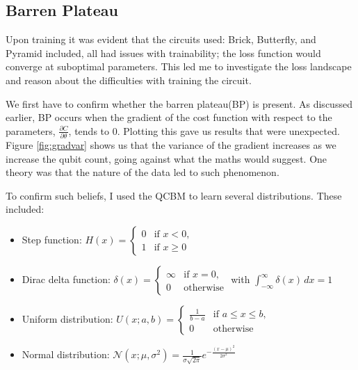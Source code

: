 \documentclass[12pt]{article}
\newcommand{\newp}
    {
    \vskip 0.5cm 
  }
\numberwithin{equation}{section}
\begin{document}
\subsection{Barren Plateau}
Upon training it was evident that the circuits used: Brick, Butterfly, and Pyramid 
included, all had issues with trainability; the loss function would converge 
at suboptimal parameters. This led me to investigate the loss landscape and reason 
about the difficulties with training the circuit.
\newp 
We first have to confirm whether the barren plateau(BP) is present. As discussed 
earlier, BP occurs when the gradient of the cost function with respect to the 
parameters, $\frac{\partial C}{\partial \theta}$, tends to 0. Plotting this gave
us results that were unexpected. Figure \ref{fig:gradvar} shows us that the 
variance of the gradient increases as we increase the qubit count, going against 
what the maths would suggest. One theory was that the nature of the data led to 
such phenomenon. 
\newp
To confirm such beliefs, I used the QCBM to learn several distributions. These 
included:
\begin{itemize}
  \item Step function: $H(x) = \begin{cases} 
                                0 & \text{if } x < 0, \\
                                1 & \text{if } x \geq 0 
                              \end{cases}$
  
  \item Dirac delta function: $\delta(x) = \begin{cases} 
                                          \infty & \text{if } x = 0, \\
                                          0 & \text{otherwise}
                                        \end{cases}$ with $\int_{-\infty}^{\infty} \delta(x) \, dx = 1$
  
  \item Uniform distribution: $U(x; a, b) = \begin{cases} 
                                          \frac{1}{b-a} & \text{if } a \leq x \leq b, \\
                                          0 & \text{otherwise}
                                        \end{cases}$
  
  \item Normal distribution: $\mathcal{N}(x; \mu, \sigma^2) = \frac{1}{\sigma\sqrt{2\pi}} e^{-\frac{(x-\mu)^2}{2\sigma^2}}$

\end{itemize}
\end{document}
